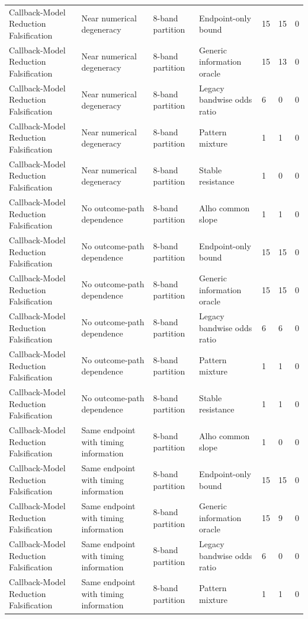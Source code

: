 \begin{tabular}{lllllll}
Callback-Model Reduction Falsification & Near numerical degeneracy & 8-band partition & Endpoint-only bound & 15 & 15 & 0 \\
Callback-Model Reduction Falsification & Near numerical degeneracy & 8-band partition & Generic information oracle & 15 & 13 & 0 \\
Callback-Model Reduction Falsification & Near numerical degeneracy & 8-band partition & Legacy bandwise odds ratio & 6 & 0 & 0 \\
Callback-Model Reduction Falsification & Near numerical degeneracy & 8-band partition & Pattern mixture & 1 & 1 & 0 \\
Callback-Model Reduction Falsification & Near numerical degeneracy & 8-band partition & Stable resistance & 1 & 0 & 0 \\
Callback-Model Reduction Falsification & No outcome-path dependence & 8-band partition & Alho common slope & 1 & 1 & 0 \\
Callback-Model Reduction Falsification & No outcome-path dependence & 8-band partition & Endpoint-only bound & 15 & 15 & 0 \\
Callback-Model Reduction Falsification & No outcome-path dependence & 8-band partition & Generic information oracle & 15 & 15 & 0 \\
Callback-Model Reduction Falsification & No outcome-path dependence & 8-band partition & Legacy bandwise odds ratio & 6 & 6 & 0 \\
Callback-Model Reduction Falsification & No outcome-path dependence & 8-band partition & Pattern mixture & 1 & 1 & 0 \\
Callback-Model Reduction Falsification & No outcome-path dependence & 8-band partition & Stable resistance & 1 & 1 & 0 \\
Callback-Model Reduction Falsification & Same endpoint with timing information & 8-band partition & Alho common slope & 1 & 0 & 0 \\
Callback-Model Reduction Falsification & Same endpoint with timing information & 8-band partition & Endpoint-only bound & 15 & 15 & 0 \\
Callback-Model Reduction Falsification & Same endpoint with timing information & 8-band partition & Generic information oracle & 15 & 9 & 0 \\
Callback-Model Reduction Falsification & Same endpoint with timing information & 8-band partition & Legacy bandwise odds ratio & 6 & 0 & 0 \\
Callback-Model Reduction Falsification & Same endpoint with timing information & 8-band partition & Pattern mixture & 1 & 1 & 0 \\

\end{tabular}
